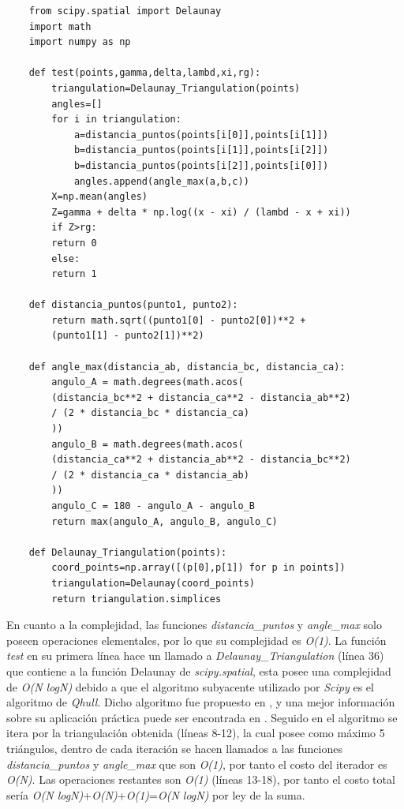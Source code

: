 \documentclass[12pt]{report}
\begin{document}
\begin{lstlisting}
	from scipy.spatial import Delaunay
	import math
	import numpy as np
	
	def test(points,gamma,delta,lambd,xi,rg):
		triangulation=Delaunay_Triangulation(points)
		angles=[]
		for i in triangulation:
			a=distancia_puntos(points[i[0]],points[i[1]])
			b=distancia_puntos(points[i[1]],points[i[2]])
			b=distancia_puntos(points[i[2]],points[i[0]])
			angles.append(angle_max(a,b,c))
		X=np.mean(angles)
		Z=gamma + delta * np.log((x - xi) / (lambd - x + xi))
		if Z>rg:
		return 0
		else:
		return 1
	
	def distancia_puntos(punto1, punto2):
		return math.sqrt((punto1[0] - punto2[0])**2 +
		(punto1[1] - punto2[1])**2)
	
	def angle_max(distancia_ab, distancia_bc, distancia_ca):
		angulo_A = math.degrees(math.acos(
		(distancia_bc**2 + distancia_ca**2 - distancia_ab**2) 
		/ (2 * distancia_bc * distancia_ca)
		))
		angulo_B = math.degrees(math.acos(
		(distancia_ca**2 + distancia_ab**2 - distancia_bc**2) 
		/ (2 * distancia_ca * distancia_ab)
		))
		angulo_C = 180 - angulo_A - angulo_B  
		return max(angulo_A, angulo_B, angulo_C)
		
	def Delaunay_Triangulation(points):
		coord_points=np.array([(p[0],p[1]) for p in points])
		triangulation=Delaunay(coord_points)
		return triangulation.simplices
\end{lstlisting}

En cuanto a la complejidad, las funciones \textit{distancia\_puntos} y \textit{angle\_max} solo poseen operaciones elementales, por lo que su complejidad es \textit{O(1)}. La función\textit{ test} en su primera línea hace un llamado a  \textit{Delaunay\_Triangulation} (línea 36) que  contiene a la función Delaunay de \textit{scipy.spatial}, esta posee una complejidad de \textit{O(N logN)} debido a que el algoritmo subyacente utilizado por \textit{Scipy} es el algoritmo de \textit{Qhull}. Dicho algoritmo fue propuesto en \cite{31}, y una mejor información sobre su aplicación práctica puede ser encontrada en \cite{32}. Seguido en el algoritmo se itera por la triangulación obtenida (líneas 8-12), la cual posee como máximo 5 triángulos, dentro de cada iteración se hacen llamados a las  funciones \textit{distancia\_puntos} y \textit{angle\_max}  que son \textit{O(1)}, por tanto el costo del iterador es \textit{O(N)}. Las operaciones restantes son \textit{O(1)} (líneas 13-18), por tanto el costo total sería \textit{O(N logN)}+\textit{O(N)}+\textit{O(1)}=\textit{O(N logN)} por ley de la suma.
\end{document}
